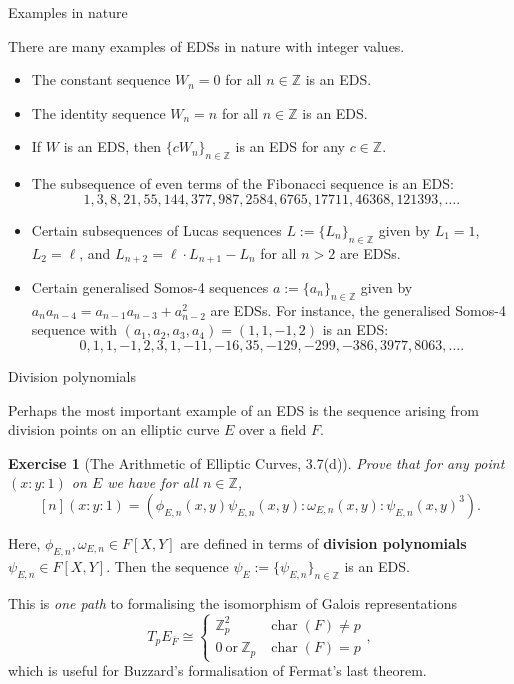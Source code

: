 \documentclass[10pt]{beamer}
\newtheorem{exercise}{Exercise}
\begin{document}
\begin{frame}[t]{Examples in nature}

There are many examples of EDSs in nature with integer values.

\begin{examples}
\begin{itemize}
\item The constant sequence $ W_n = 0 $ for all $ n \in \mathbb{Z} $ is an EDS.
\item The identity sequence $ W_n = n $ for all $ n \in \mathbb{Z} $ is an EDS.
\item If $ W $ is an EDS, then $ \{cW_n\}_{n \in \mathbb{Z}} $ is an EDS for any $ c \in \mathbb{Z} $.
\item The subsequence of even terms of the Fibonacci sequence is an EDS:
$$ 1, 3, 8, 21, 55, 144, 377, 987, 2584, 6765, 17711, 46368, 121393, \dots. $$
\item Certain subsequences of Lucas sequences $ L := \{L_n\}_{n \in \mathbb{Z}} $ given by $ L_1 = 1 $, $ L_2 = \ell $, and $ L_{n + 2} = \ell \cdot L_{n + 1} - L_n $ for all $ n > 2 $ are EDSs.
\item Certain generalised Somos-4 sequences $ a := \{a_n\}_{n \in \mathbb{Z}} $ given by $ a_na_{n - 4} = a_{n - 1}a_{n - 3} + a_{n - 2}^2 $ are EDSs. For instance, the generalised Somos-4 sequence with $ (a_1, a_2, a_3, a_4) = (1, 1, -1, 2) $ is an EDS:
$$ 0, 1, 1, -1, 2, 3, 1, -11, -16, 35, -129, -299, -386, 3977, 8063, \dots. $$
\end{itemize}
\end{examples}

\end{frame}

\begin{frame}[t]{Division polynomials}

Perhaps the most important example of an EDS is the sequence arising from division points on an elliptic curve $ E $ over a field $ F $.

\begin{exercise}[The Arithmetic of Elliptic Curves, 3.7(d)]
Prove that for any point $ (x : y : 1) $ on $ E $ we have for all $ n \in \mathbb{Z} $,
$$ [n](x : y : 1) = (\phi_{E, n}(x, y)\psi_{E, n}(x, y) : \omega_{E, n}(x, y) : \psi_{E, n}(x, y)^3). $$
\end{exercise}

Here, $ \phi_{E, n}, \omega_{E, n} \in F[X, Y] $ are defined in terms of \textbf{division polynomials} $ \psi_{E, n} \in F[X, Y] $. Then the sequence $ \psi_E := \{\psi_{E, n}\}_{n \in \mathbb{Z}} $ is an EDS.

\vspace{0.5cm} This is \emph{one path} to formalising the isomorphism of Galois representations
$$ T_pE_{\overline{F}} \cong \begin{cases} \mathbb{Z}_p^2 & \operatorname{char}(F) \ne p \\ 0 \ \text{or} \ \mathbb{Z}_p & \operatorname{char}(F) = p \end{cases}, $$
which is useful for Buzzard's formalisation of Fermat's last theorem.

\end{frame}
\end{document}
